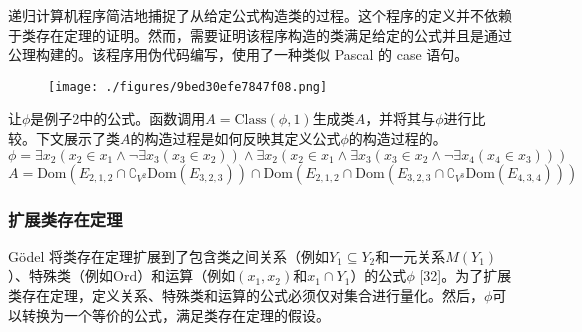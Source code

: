 递归计算机程序简洁地捕捉了从给定公式构造类的过程。这个程序的定义并不依赖于类存在定理的证明。然而，需要证明该程序构造的类满足给定的公式并且是通过公理构建的。该程序用伪代码编写，使用了一种类似 Pascal 的 case 语句。
\begin{figure}[ht]
\centering
\texttt{[image: ./figures/9bed30efe7847f08.png]}
\caption{} \label{fig_NBG_1}
\end{figure}
让\(\phi\)是例子2中的公式。函数调用\(A = \text{Class}(\phi, 1)\)生成类\(A\)，并将其与\(\phi\)进行比较。下文展示了类\(A\)的构造过程是如何反映其定义公式\(\phi\)的构造过程的。
\[
\phi = \exists x_2 (x_2 \in x_1 \land \neg \exists x_3 (x_3 \in x_2)) \land \exists x_2 (x_2 \in x_1 \land \exists x_3 (x_3 \in x_2 \land \neg \exists x_4 (x_4 \in x_3)))~
\]
\[
A = \text{Dom}(E_{2,1,2} \cap \complement_{V^2} \text{Dom}(E_{3,2,3})) \cap \text{Dom}(E_{2,1,2} \cap \text{Dom}(E_{3,2,3} \cap \complement_{V^3} \text{Dom}(E_{4,3,4})))~
\]
\subsubsection{扩展类存在定理}  
Gödel 将类存在定理扩展到了包含类之间关系（例如\( Y_1 \subseteq Y_2 \)和一元关系\( M(Y_1) \)）、特殊类（例如\( \text{Ord}\)）和运算（例如\( (x_1, x_2) \)和\( x_1 \cap Y_1 \)）的公式\(\phi\) [32]。为了扩展类存在定理，定义关系、特殊类和运算的公式必须仅对集合进行量化。然后，\(\phi\)可以转换为一个等价的公式，满足类存在定理的假设。

